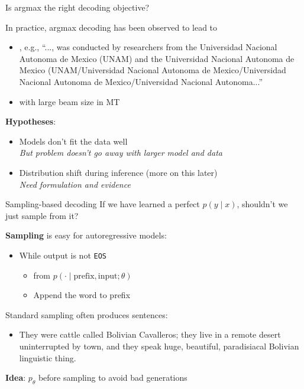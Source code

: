 \documentclass[usenames,dvipsnames,notes,11pt,aspectratio=169,hyperref={colorlinks=true, linkcolor=blue}]{beamer}
\begin{document}
\begin{frame}
    {Is argmax the right decoding objective?}

    In practice, argmax decoding has been observed to lead to\\
    \begin{itemize}
        \item {}, e.g., 
            {\small
                ``..., was conducted by researchers from the Universidad Nacional Autonoma de Mexico (UNAM) and {the Universidad Nacional Autonoma de Mexico (UNAM/Universidad Nacional Autonoma de Mexico/Universidad Nacional Autonoma de Mexico/Universidad Nacional Autonoma...}''}
            \item {} with large beam size in MT
    \end{itemize}

    \pause
    {\bf Hypotheses}:\\
    \begin{itemize}
        \item Models don't fit the data well \\
            {\em But problem doesn't go away with larger model and data}
        \item Distribution shift during inference (more on this later)\\
            {\em Need formulation and evidence}
    \end{itemize}
\end{frame}

\begin{frame}
    {Sampling-based decoding}
    If we have learned a perfect $p(y\mid x)$, shouldn't we just sample from it?
    \pause

    \textbf{Sampling} is easy for autoregressive models:\\
    \begin{itemize}
        \item While output is not \texttt{EOS}
            \begin{itemize}
                \item {} from $p(\cdot\mid \text{prefix}, \text{input};\theta)$
                \item Append the word to prefix
            \end{itemize}
    \end{itemize}

    \pause
    Standard sampling often produces  sentences:\\
    \begin{itemize}
        \item[] {\footnotesize They were cattle called Bolivian Cavalleros; they live in a remote desert uninterrupted by town, and they speak huge, beautiful, paradisiacal Bolivian linguistic thing.}
    \end{itemize}

    \textbf{Idea}:  $p_\theta$ before sampling to avoid bad generations 
\end{frame}
\end{document}
